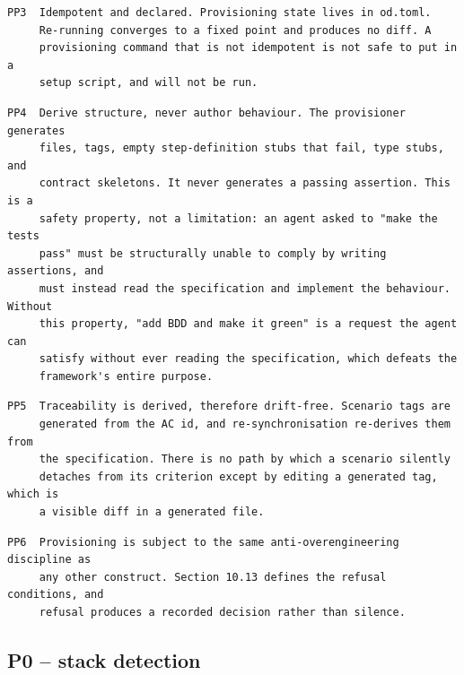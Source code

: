 \documentclass[11pt,a4paper]{article}
\begin{document}
\begin{Verbatim}[fontsize=\footnotesize,breaklines=true,breakanywhere=true,breakautoindent=false,samepage=false]
PP3  Idempotent and declared. Provisioning state lives in od.toml.
     Re-running converges to a fixed point and produces no diff. A
     provisioning command that is not idempotent is not safe to put in a
     setup script, and will not be run.
\end{Verbatim}

\begin{Verbatim}[fontsize=\footnotesize,breaklines=true,breakanywhere=true,breakautoindent=false,samepage=false]
PP4  Derive structure, never author behaviour. The provisioner generates
     files, tags, empty step-definition stubs that fail, type stubs, and
     contract skeletons. It never generates a passing assertion. This is a
     safety property, not a limitation: an agent asked to "make the tests
     pass" must be structurally unable to comply by writing assertions, and
     must instead read the specification and implement the behaviour. Without
     this property, "add BDD and make it green" is a request the agent can
     satisfy without ever reading the specification, which defeats the
     framework's entire purpose.
\end{Verbatim}

\begin{Verbatim}[fontsize=\footnotesize,breaklines=true,breakanywhere=true,breakautoindent=false,samepage=false]
PP5  Traceability is derived, therefore drift-free. Scenario tags are
     generated from the AC id, and re-synchronisation re-derives them from
     the specification. There is no path by which a scenario silently
     detaches from its criterion except by editing a generated tag, which is
     a visible diff in a generated file.
\end{Verbatim}

\begin{Verbatim}[fontsize=\footnotesize,breaklines=true,breakanywhere=true,breakautoindent=false,samepage=false]
PP6  Provisioning is subject to the same anti-overengineering discipline as
     any other construct. Section 10.13 defines the refusal conditions, and
     refusal produces a recorded decision rather than silence.
\end{Verbatim}

\subsection{P0 -- stack detection}
\end{document}
